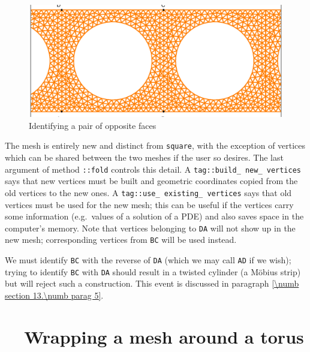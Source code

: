 \begin{figure}[ht] \centering
  \includegraphics[width=120mm]{cylinder-1.eps}
  \caption{Identifying a pair of opposite faces}
  \label{\numb section 7.\numb fig 12}
\end{figure}

The mesh {\small\tt{}} is entirely new and distinct from {\small\tt square},
with the exception of vertices which can be shared between the two meshes if the
user so desires.
The last argument of method {\small\tt{}::fold} controls this detail.
A {\small\tt\textcolor{tag}{tag}::build\_\,new\_\,vertices} says that new vertices must be built
and geometric coordinates copied from the old vertices to the new ones.
A {\small\tt\textcolor{tag}{tag}::use\_\,existing\_\,vertices} says that old vertices must be used
for the new mesh; this can be useful if the vertices carry some information
(e.g.\ values of a solution of a PDE) and also saves space in the computer's memory.
Note that vertices belonging to {\small\tt DA} will not show up in the
new mesh; corresponding vertices from {\small\tt BC} will be used instead.

We must identify {\small\tt BC} with the reverse of {\small\tt DA} (which we may call
{\small\tt AD} if we wish); trying to identify {\small\tt BC} with {\small\tt DA} should
result in a twisted cylinder (a M\"obius strip) but {\maniFEM} will reject such a construction.
This event is discussed in paragraph \ref{\numb section 13.\numb parag 5}.


\section{~~Wrapping a mesh around a torus}\label{\numb section 7.\numb parag 17}

